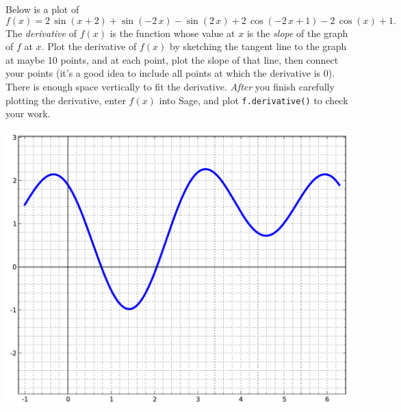 Below is a plot of $$f(x)=2 \, \sin\left(x + 2\right) + \sin\left(-2 \, x\right) - \sin\left(2 \, x\right) + 2 \, \cos\left(-2 \, x + 1\right) - 2 \, \cos\left(x\right) + 1.$$  The {\em \color{red}derivative} of $f(x)$ is the function whose value at $x$ is the {\em slope} of the graph of $f$ at $x$.  Plot the derivative of $f(x)$ by sketching the tangent line to the graph at maybe 10 points, and at each point, plot the slope of that line, then connect your points (it's a good idea to include all points at which the derivative is 0).  There is enough space vertically to fit the derivative.  {\em After} you finish carefully plotting the derivative, enter $f(x)$ into Sage, and plot {\color{blue}\verb|f.derivative()|} to check your work.
\begin{center}\includegraphics{functions/98.pdf}\end{center}\newpage

